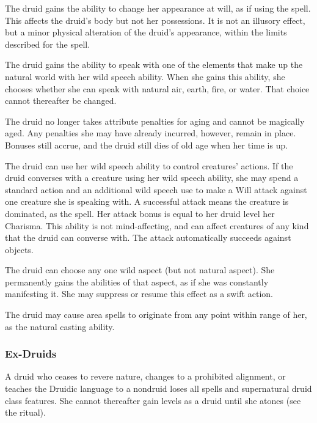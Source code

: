  The druid gains the ability to change her appearance at will, as if using the  spell. This affects the druid's body but not her possessions. It is not an illusory effect, but a minor physical alteration of the druid's appearance, within the limits described for the spell.

 The druid gains the ability to speak with one of the elements that make up the natural world with her wild speech ability. When she gains this ability, she chooses whether she can speak with natural air, earth, fire, or water. That choice cannot thereafter be changed.

 The druid no longer takes attribute penalties for aging and cannot be magically aged. Any penalties she may have already incurred, however, remain in place. Bonuses still accrue, and the druid still dies of old age when her time is up.

 The druid can use her wild speech ability to control creatures' actions. If the druid converses with a creature using her wild speech ability, she may spend a standard action and an additional wild speech use to make a Will attack against one creature she is speaking with. A successful attack means the creature is dominated, as the  spell. Her attack bonus is equal to her druid level \add her Charisma. This ability is not mind-affecting, and can affect creatures of any kind that the druid can converse with. The attack automatically succeeds against objects.

 The druid can choose any one wild aspect (but not natural aspect). She permanently gains the abilities of that aspect, as if she was constantly manifesting it. She may suppress or resume this effect as a swift action.

 The druid may cause area spells to originate from any point within \rngmed range of her, as the natural casting ability.

\subsubsection{Ex-Druids}
A druid who ceases to revere nature, changes to a prohibited alignment, or teaches the Druidic language to a nondruid loses all spells and supernatural druid class features. She cannot thereafter gain levels as a druid until she atones (see the  ritual).


